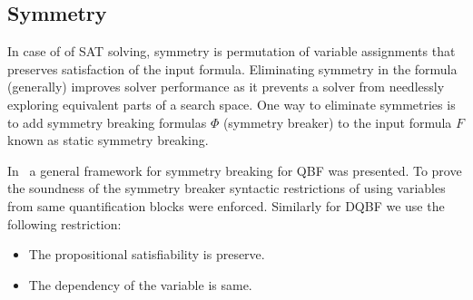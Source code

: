 \documentclass[conference]{IEEEtran}
\begin{document}
\subsection{Symmetry}
\label{sec:sym}

%
In case of of SAT solving, symmetry is permutation of variable assignments that preserves satisfaction of the input formula.
%
Eliminating symmetry in the formula (generally) improves solver performance as it prevents a solver from 
needlessly exploring equivalent parts of a search space.
%
One way to eliminate symmetries is to add symmetry breaking formulas $\Phi$ (symmetry breaker) to the input formula $F$ 
known as static symmetry breaking.
% 
%
%
%
%

In~\cite{kauers2018symmetries} a general framework for symmetry breaking for QBF was presented. To prove the soundness of the symmetry breaker syntactic restrictions of using variables from same quantification blocks were enforced.
%
Similarly for DQBF we use the following restriction:
\begin{itemize}
   \item The propositional satisfiability is preserve.
   \item The dependency of the variable is same. 
\end{itemize}
\end{document}
